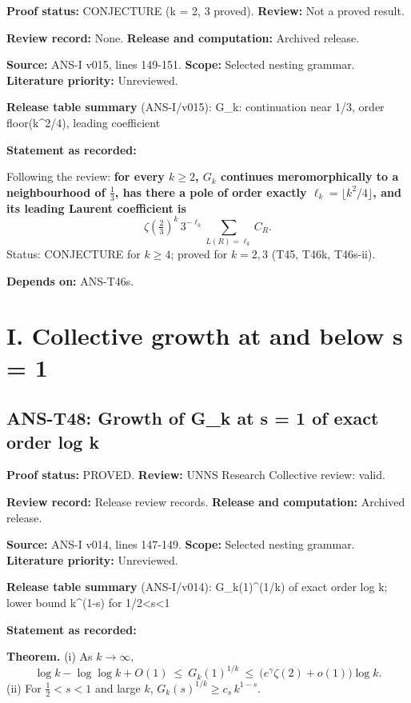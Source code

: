 \documentclass[
  11pt,
]{article}
\begin{document}
\textbf{Proof status:} CONJECTURE (k = 2, 3 proved). \textbf{Review:}
Not a proved result.

\textbf{Review record:} None. \textbf{Release and computation:} Archived
release.

\textbf{Source:} ANS-I v015, lines 149-151. \textbf{Scope:} Selected
nesting grammar. \textbf{Literature priority:} Unreviewed.

\textbf{Release table summary} (ANS-I/v015): G\_k: continuation near
1/3, order floor(k\^{}2/4), leading coefficient

\textbf{Statement as recorded:}

Following the review: \textbf{for every \(k\ge2\), \(G_k\) continues
meromorphically to a neighbourhood of \(\frac13\), has there a pole of
order exactly \(\ell_k=\lfloor k^2/4\rfloor\), and its leading Laurent
coefficient is}
\[\zeta(\tfrac23)^k\,3^{-\ell_k}\sum_{L(R)=\ell_k}C_R .\] Status:
CONJECTURE for \(k\ge4\); proved for \(k=2,3\) (T45, T46k, T46s-ii).

\textbf{Depends on:} ANS-T46s.

\hypertarget{i.-collective-growth-at-and-below-s-1}{%
\section{I. Collective growth at and below s =
1}\label{i.-collective-growth-at-and-below-s-1}}

\hypertarget{ans-t48-growth-of-g_k-at-s-1-of-exact-order-log-k}{%
\subsection{ANS-T48: Growth of G\_k at s = 1 of exact order log
k}\label{ans-t48-growth-of-g_k-at-s-1-of-exact-order-log-k}}

\textbf{Proof status:} PROVED. \textbf{Review:} UNNS Research Collective
review: valid.

\textbf{Review record:} Release review records. \textbf{Release and
computation:} Archived release.

\textbf{Source:} ANS-I v014, lines 147-149. \textbf{Scope:} Selected
nesting grammar. \textbf{Literature priority:} Unreviewed.

\textbf{Release table summary} (ANS-I/v014): G\_k(1)\^{}(1/k) of exact
order log k; lower bound k\^{}(1-s) for 1/2\textless s\textless1

\textbf{Statement as recorded:}

\textbf{Theorem.} (i) As \(k\to\infty\),
\[\log k-\log\log k+O(1)\ \le\ G_k(1)^{1/k}\ \le\ \big(e^{\gamma}\zeta(2)+o(1)\big)\log k .\]
(ii) For \(\frac12<s<1\) and large \(k\),
\(G_k(s)^{1/k}\ge c_s\,k^{1-s}\).
\end{document}
